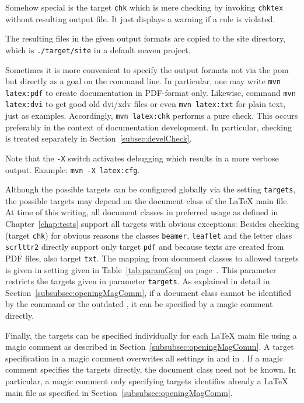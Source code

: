 Somehow special is the target \texttt{chk} 
which is mere checking by invoking \texttt{chktex} 
without resulting output file. 
It just displays a warning if a rule is violated. 

The resulting files in the given output formats 
are copied to the site directory, 
which is \texttt{./target/site} in a default maven project. 

Sometimes it is more convenient 
to specify the output formats not via the pom 
but directly as a goal on the command line. 
In particular, one may write \texttt{mvn latex:pdf} to create documentation 
in PDF-format only.
Likewise, command \texttt{mvn latex:dvi} to get good old dvi/xdv files
or even \texttt{mvn latex:txt} for plain text, just as examples. 
Accordingly, \texttt{mvn latex:chk} performs a pure check. 
This occurs preferably in the context of documentation development. 
In particular, checking is treated separately in Section~\ref{subsec:develCheck}. 

Note that the \texttt{-X} switch activates debugging 
which results in a more verbose output. 
Example: \texttt{mvn -X latex:cfg}. 

Although the possible targets can be configured globally 
via the setting \texttt{targets}, 
the possible targets may depend on the document class of the \LaTeX{} main file. 
At time of this writing, 
all document classes in preferred usage as defined in Chapter~\ref{chap:tests} 
support all targets with obvious exceptions: 
Besides checking (target \texttt{chk}) for obvious reasons 
the classes \texttt{beamer}, \texttt{leaflet} and the letter class \texttt{scrlttr2} 
directly support only target \texttt{pdf} 
and because texts are created from PDF files, also target \texttt{txt}. 
The mapping from document classes to allowed targets 
is given in setting  given in 
Table~\ref{tab:paramGen} on page~\pageref{tab:paramGen}. 
This parameter restricts the targets given in parameter \texttt{targets}. 
As explained in detail in Section~\ref{subsubsec:openingMagComm}, 
if a document class cannot be identified by the command  
or the outdated , 
it can be specified by a magic comment directly. 

Finally, the targets can be specified individually for each \LaTeX{} main file 
using a magic comment as described in Section~\ref{subsubsec:openingMagComm}. 
A target specification in a magic comment overwrites all settings in 
 and in . 
If a magic comment specifies the targets directly, 
the document class need not be known. 
In particular, a magic comment only specifying targets identifies already a \LaTeX{} main file 
as specified in Section~\ref{subsubsec:openingMagComm}. 

